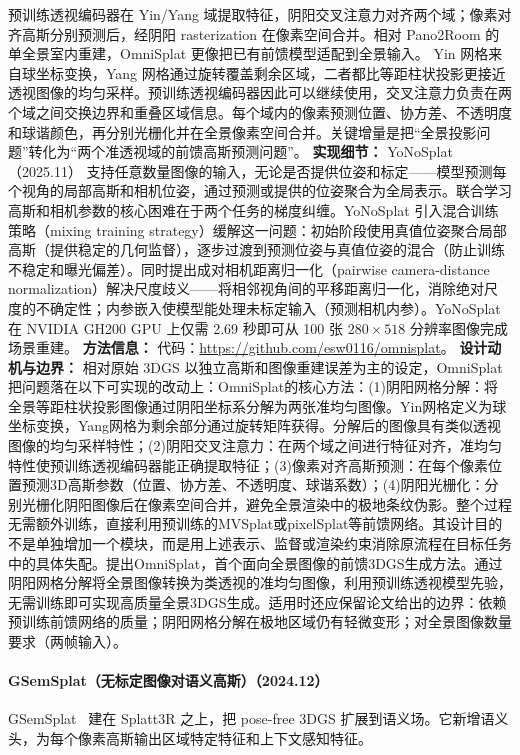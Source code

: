 预训练透视编码器在 Yin/Yang 域提取特征，阴阳交叉注意力对齐两个域；像素对齐高斯分别预测后，经阴阳 rasterization 在像素空间合并。相对 Pano2Room 的单全景室内重建，OmniSplat 更像把已有前馈模型适配到全景输入。
Yin 网格来自球坐标变换，Yang 网格通过旋转覆盖剩余区域，二者都比等距柱状投影更接近透视图像的均匀采样。预训练透视编码器因此可以继续使用，交叉注意力负责在两个域之间交换边界和重叠区域信息。每个域内的像素预测位置、协方差、不透明度和球谐颜色，再分别光栅化并在全景像素空间合并。关键增量是把“全景投影问题”转化为“两个准透视域的前馈高斯预测问题”。
\textbf{实现细节：} YoNoSplat（2025.11） 支持任意数量图像的输入，无论是否提供位姿和标定——模型预测每个视角的局部高斯和相机位姿，通过预测或提供的位姿聚合为全局表示。联合学习高斯和相机参数的核心困难在于两个任务的梯度纠缠。YoNoSplat 引入混合训练策略（mixing training strategy）缓解这一问题：初始阶段使用真值位姿聚合局部高斯（提供稳定的几何监督），逐步过渡到预测位姿与真值位姿的混合（防止训练不稳定和曝光偏差）。同时提出成对相机距离归一化（pairwise camera-distance normalization）解决尺度歧义——将相邻视角间的平移距离归一化，消除绝对尺度的不确定性；内参嵌入使模型能处理未标定输入（预测相机内参）。YoNoSplat 在 NVIDIA GH200 GPU 上仅需 2.69 秒即可从 100 张 $280 \times 518$ 分辨率图像完成场景重建。
\textbf{方法信息：} 代码：\url{https://github.com/esw0116/omnisplat}。
\textbf{设计动机与边界：} 相对原始 3DGS 以独立高斯和图像重建误差为主的设定，OmniSplat 把问题落在以下可实现的改动上：OmniSplat的核心方法：(1)阴阳网格分解：将全景等距柱状投影图像通过阴阳坐标系分解为两张准均匀图像。Yin网格定义为球坐标变换，Yang网格为剩余部分通过旋转矩阵获得。分解后的图像具有类似透视图像的均匀采样特性；(2)阴阳交叉注意力：在两个域之间进行特征对齐，准均匀特性使预训练透视编码器能正确提取特征；(3)像素对齐高斯预测：在每个像素位置预测3D高斯参数（位置、协方差、不透明度、球谐系数）；(4)阴阳光栅化：分别光栅化阴阳图像后在像素空间合并，避免全景渲染中的极地条纹伪影。整个过程无需额外训练，直接利用预训练的MVSplat或pixelSplat等前馈网络。其设计目的不是单独增加一个模块，而是用上述表示、监督或渲染约束消除原流程在目标任务中的具体失配。提出OmniSplat，首个面向全景图像的前馈3DGS生成方法。通过阴阳网格分解将全景图像转换为类透视的准均匀图像，利用预训练透视模型先验，无需训练即可实现高质量全景3DGS生成。适用时还应保留论文给出的边界：依赖预训练前馈网络的质量；阴阳网格分解在极地区域仍有轻微变形；对全景图像数量要求（两帧输入）。
\paragraph{GSemSplat（无标定图像对语义高斯）（2024.12）}
GSemSplat~\cite{2412_16932} 建在 Splatt3R 之上，把 pose-free 3DGS 扩展到语义场。它新增语义头，为每个像素高斯输出区域特定特征和上下文感知特征。


